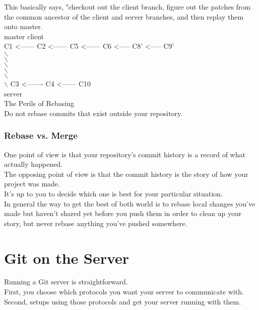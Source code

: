 \documentclass[11pt]{article}
\begin{document}
This basically says, "checkout out the client branch, figure out the patches from the common ancestor of the client and server branches, and then replay them onto master.\\


                                master			client\\
C1 <------ C2 <------ C5 <------ C6 <----- C8' <----- C9'\\
            $\backslash$\\
                    $\backslash$\\
              $\backslash$\\
                      $\backslash$\\
                $\backslash$\\
                               $\backslash$   C3 <------- C4 <------ C10\\
                                           server\\

The Perils of Rebasing\\
Do not rebase commits that exist outside your repository.\\


\subsubsection{Rebase vs. Merge}
\label{sec:orgbeae773}
One point of view is that your repository's commit history is a record of what actually happened.\\
The opposing point of view is that the commit history is the story of how your project was made.\\

It's up to you to decide which one is best for your particular situation.\\

In general the way to get the best of both world is to rebase local changes you've made but haven't shared yet before you push them in order to clean up your story, but never rebase anything you've pushed somewhere.\\



\section{Git on the Server}
\label{sec:org66245df}
Running a Git server is straightforward.\\
First, you choose which protocols you want your server to communicate with.\\
Second, setups using those protocols and get your server running with them.\\
\end{document}
